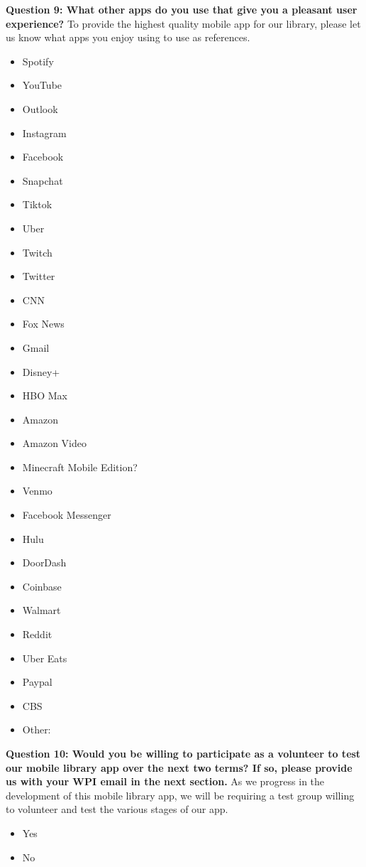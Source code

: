 \noindent\textbf{Question 9: What other apps do you use that give you a pleasant user experience?}
\newline
To provide the highest quality mobile app for our library, please let us know what apps you enjoy using to use as references.
\begin{itemize}
    \item Spotify
    \item YouTube
    \item Outlook
    \item Instagram
    \item Facebook
    \item Snapchat
    \item Tiktok
    \item Uber
    \item Twitch
    \item Twitter
    \item CNN
    \item Fox News
    \item Gmail
    \item Disney+
    \item HBO Max
    \item Amazon
    \item Amazon Video
    \item Minecraft Mobile Edition?
    \item Venmo
    \item Facebook Messenger
    \item Hulu
    \item DoorDash
    \item Coinbase
    \item Walmart
    \item Reddit
    \item Uber Eats
    \item Paypal
    \item CBS
    \item Other:
\end{itemize}
\newline


\noindent\textbf{Question 10: Would you be willing to participate as a volunteer to test our mobile library app over the next two terms? If so, please provide us with your WPI email in the next section.}
\newline
As we progress in the development of this mobile library app, we will be requiring a test group willing to volunteer and test the various stages of our app.
\begin{itemize}
    \item Yes
    \item No
\end{itemize}
\newline


